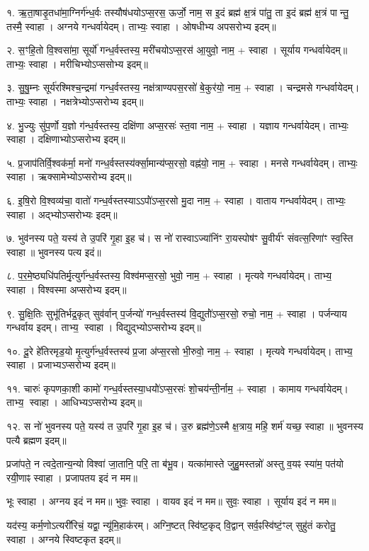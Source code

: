 १. ऋ॒ता॒षाडृ॒तधा॑मा॒ग्निर्ग॑न्ध॒र्वः तस्यौष॑धयोऽप्स॒रस॒ ऊर्जो॒ नाम॒
स इ॒दं ब्रह्म॑ क्ष॒त्रं पा॑तु॒ ता इ॒दं ब्रह्म॑ क्ष॒त्रं पान्तु॒ तस्मै॒ स्वाहा। 
अग्नये गन्धर्वायेदम्। ताभ्यः॒ स्वाहा। ओषधीभ्य अपसरोभ्य इदम्॥

२. स॒ꣳहि॒तो वि॒श्वसा॑मा॒ सूर्यो॑ गन्ध॒र्वस्तस्य॒ मरी॑चयोऽप्स॒रस॑ आ॒युवो॒ नाम॒ + स्वाहा।
सूर्याय गन्धर्वायेदम्॥ ताभ्यः॒ स्वाहा। मरीचिभ्योऽप्ससोभ्य इदम्॥

३. सु॒षु॒म्नः सूर्य॑रश्मिश्च॒न्द्रमा॑ गन्ध॒र्वस्तस्य॒ नक्ष॑त्राण्यपस॒रसो॑ बे॒कुर॑यो॒ नाम॒ + स्वाहा।
चन्द्रमसे गन्धर्वायेदम्। ताभ्यः॒ स्वाहा। नक्षत्रेभ्योऽप्सरोभ्य इदम्॥

४. भु॒ज्युः सु॑प॒र्णो य॒ज्ञो ग॑न्ध॒र्वस्तस्य॒ दक्षि॑णा अप्स॒रसः॑ स्त॒वा नाम॒ + स्वाहा।
यज्ञाय गन्धर्वायेदम्। ताभ्यः॒ स्वाहा। दक्षिणाभ्योऽप्सरोभ्य इदम्॥

५. प्र॒जाप॑तिर्वि॒श्वक॑र्मा॒ मनो॑ गन्ध॒र्वस्तस्य॑र्क्सा॒मान्य॑प्स॒रसो॒ वह्न॑यो॒ नाम॒ + स्वाहा।
मनसे गन्धर्वायेदम्। ताभ्यः॒ स्वाहा। ऋक्सामेभ्योऽप्सरोभ्य इदम्॥

६. इ॒षि॒रो वि॒श्वव्य॑चा॒ वातो॑ गन्ध॒र्वस्तस्याऽऽपो॑॑ऽप्स॒रसो मु॒दा नाम॒ + स्वाहा।
वाताय गन्धर्वायेदम्। ताभ्यः॒ स्वाहा। अद्भ्योऽप्सरोभ्यः इदम्॥

७. भुव॑नस्य पते॒ यस्य॑ ते उ॒परि॑ गृ॒हा इ॒ह च॑।
स नो॑ रास्वाऽज्या॑निंꣳ रा॒यस्पोष॑ꣳ सु॒वीर्य॑ꣳ संवत्स॒रिणा॑ꣳ स्व॒स्ति स्वाहा॥ भुवनस्य पत्य इदं॥

८. प॒र॒मे॒ष्ठ्यधि॑पतिर्मृ॒त्युर्ग॑न्ध॒र्वस्तस्य॒ विश्व॑मप्स॒रसो॒ भुवो॒ नाम॒ + स्वाहा।
मृत्यवे गन्धर्वायेदम्। ताभ्य॒ स्वाहा। विश्वस्मा अप्सरोभ्य इदम्॥

९. सु॒क्षि॒तिः सुभू॑तिर्भद्र॒कृत् सुव॑र्वान् प॒र्जन्यो॑ गन्ध॒र्वस्तस्य॑ वि॒द्युतो॑॑ऽप्स॒रसो॒ रुचो॒ नाम॒ + स्वाहा। पर्जन्याय गन्धर्वाय इदम्। ताभ्य॒ स्वाहा। विद्युद्भ्योऽप्सरोभ्य इदम्॥

१०. दू॒रे हे॑तिरमृड॒यो मृ॒त्युर्ग॑न्ध॒र्वस्तस्य॑ प्र॒जा अ॑प्स॒रसो भी॒रुवो॒ नाम॒ + स्वाहा।
मृत्यवे गन्धर्वायेदम्। ताभ्य॒ स्वाहा। प्रजाभ्यऽप्सरोभ्य इदम्॥

११. चारुः॑ कृपणका॒शी कामो॑ गन्ध॒र्वस्तस्या॒धयो॑॑ऽप्स॒रसः॑ शो॒चय॑न्ती॒र्नाम॒ + स्वाहा।
कामाय गन्धर्वायेदम्। ताभ्य॒ स्वाहा। आधिभ्यऽप्सरोभ्य इदम्॥

१२. स नो॑ भुवनस्य पते॒ यस्य॑ त उ॒परि॑ गृ॒हा इ॒ह च॑।
उ॒रु ब्रह्म॑णे॒ऽस्मै क्ष॒त्राय॒ महि॒ शर्म॑ यच्छ॒ स्वाहा॥ भुवनस्य पत्यै ब्रह्मण इदम्॥

प्रजा॑पते॒ न त्वदे॒तान्य॒न्यो विश्वा॑ जा॒तानि॒ परि॒ ता ब॑भू॒व।
यत्का॑मास्ते जुहु॒मस्तन्नो॑ अस्तु व॒यꣴ स्या॑म॒ पत॑यो रयी॒णाꣴ स्वाहा। प्रजापतय इदं न मम॥

भूः स्वाहा। अग्नय इदं न मम॥
भुवः॒ स्वाहा। वायव इदं न मम॥
सुवः॒ स्वाहा। सूर्याय इदं न मम॥   

यद॑स्य॒ कर्म॒णोऽत्यरी॑रिचं॒ यद्वा॒ न्यू॑मि॒हाक॑रम्। अग्नि॒ष्टत् स्वि॑ष्ट॒कृद् वि॒द्वान् सर्व॒ꣴस्वि॑ष्टं॒ꣳल् सुहु॑तं करोतु॒ स्वाहा। अग्नये स्विष्टकृत इदम्॥